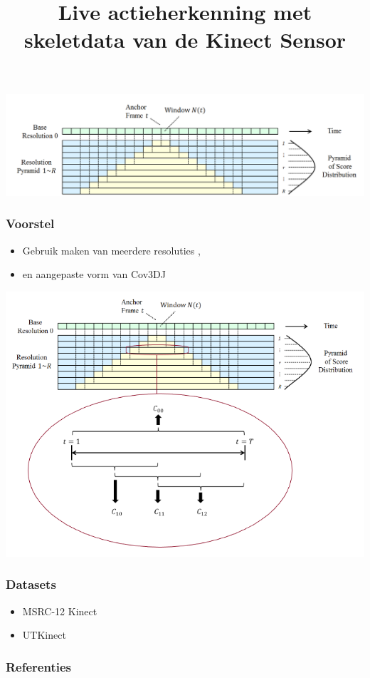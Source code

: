 \documentclass[]{beamer}
\begin{document}
	\title[Actieherkenning met de Kinect sensor]{Live actieherkenning met skeletdata van de Kinect Sensor}
	\date{}
	\frame{\titlepage}
	\begin{frame}
		\includegraphics[width=\textwidth]{pyramid}
	\end{frame}
	\begin{frame}
		\frametitle{Voorstel}

		
		\begin{itemize}
			\item Gebruik maken van meerdere resoluties \cite{Yang2012},
			\item en aangepaste vorm van Cov3DJ \cite{Hussein2013}
		\end{itemize}

	\end{frame}
	\begin{frame}
	\includegraphics[width=\textwidth]{voorstel}
	\end{frame}

	\begin{frame}
		\frametitle{Datasets}
		\begin{itemize}
			\item MSRC-12 Kinect
			\item UTKinect
		\end{itemize}
	\end{frame}

	\begin{frame}[allowframebreaks]
		\frametitle{Referenties}
		
		
	\end{frame}
	
\end{document}
